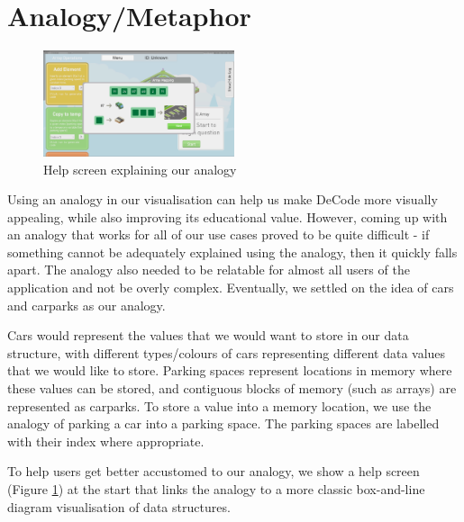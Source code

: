 \documentclass[11pt]{article}
\begin{document}
\section{Analogy/Metaphor}
\begin{figure}
  \centering
  \includegraphics[width=0.5\textwidth]{images/helpanalogy.png}
\caption{Help screen explaining our analogy}
\label{fig:helpanalogy}
\end{figure}
Using an analogy in our visualisation can help us make DeCode more visually appealing, while also improving its educational value\cite{Park}\cite{vegh2}. However, coming up with an analogy that works for all of our use cases proved to be quite difficult - if something cannot be adequately explained using the analogy, then it quickly falls apart. The analogy also needed to be relatable for almost all users of the application and not be overly complex. Eventually, we settled on the idea of cars and carparks as our analogy.\par
Cars would represent the values that we would want to store in our data structure, with different types/colours of cars representing different data values that we would like to store. Parking spaces represent locations in memory where these values can be stored, and contiguous blocks of memory (such as arrays) are represented as carparks. To store a value into a memory location, we use the analogy of parking a car into a parking space. The parking spaces are labelled with their index where appropriate.\par
To help users get better accustomed to our analogy, we show a help screen (Figure \ref{fig:helpanalogy}) at the start that links the analogy to a more classic box-and-line diagram visualisation of data structures.
\end{document}
